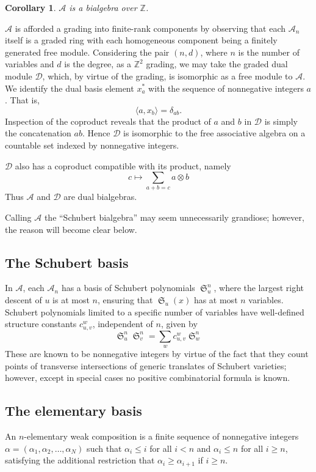 \documentclass{amsart}
\newtheorem{corollary}[lemma]{Corollary}
\theoremstyle{definition}
\theoremstyle{remark}
\numberwithin{equation}{subsection}
\DeclareMathOperator{\sch}{\mathfrak{S}}
\newcommand{\coma}{\mathcal{A}}
\newcommand{\dcoma}{\mathcal{D}}
\begin{document}
\begin{corollary}
	$\coma$ is a bialgebra over $\mathbb{Z}$.
\end{corollary}

$\coma$ is afforded a grading into finite-rank components by observing that each $\coma_n$ itself is a graded ring with each homogeneous component being a finitely generated free module. Considering the pair $(n, d)$, where $n$ is the number of variables and $d$ is the degree, as a $\mathbb{Z}^2$ grading, we may take the graded dual module $\dcoma$, which, by virtue of the grading, is isomorphic as a free module to $\coma$. We identify the dual basis element $x_a^*$ with the sequence of nonnegative integers $a$. That is,
$$\langle a, x_b\rangle = \delta_{ab}\text{.}$$
Inspection of the coproduct reveals that the product of $a$ and $b$ in $\dcoma$ is simply the concatenation $ab$. Hence $\dcoma$ is isomorphic to the free associative algebra on a countable set indexed by nonnegative integers.

$\dcoma$ also has a coproduct compatible with its product, namely
$$c\mapsto \sum_{a+b=c} a\otimes b$$
Thus $\coma$ and $\dcoma$ are dual bialgebras.

Calling $\coma$ the ``Schubert bialgebra'' may seem unnecessarily grandiose; however, the reason will become clear below.

\subsection{The Schubert basis}

In $\coma$, each $\coma_n$ has a basis of Schubert polynomials $\sch_u^n$, where the largest right descent of $u$ is at most $n$, ensuring that $\sch_u(x)$ has at most $n$ variables. Schubert polynomials limited to a specific number of variables have well-defined structure constants $c_{u,v}^w$, independent of $n$, given by
$$\sch_u^n\sch_v^n = \sum_{w}c_{u,v}^w\sch_w^n$$
These are known to be nonnegative integers by virtue of the fact that they count points of transverse intersections of generic translates of Schubert varieties; however, except in special cases no positive combinatorial formula is known.

\subsection{The elementary basis}\label{section:elementary}

An $n$-elementary weak composition is a finite sequence of nonnegative integers $\alpha=(\alpha_1,\alpha_2,\ldots,\alpha_N)$ such that $\alpha_i\leq i$ for all $i<n$ and $\alpha_i\leq n$  for all $i\geq n$, satisfying the additional restriction that $\alpha_i\geq \alpha_{i+1}$ if $i\geq n$.
\end{document}
